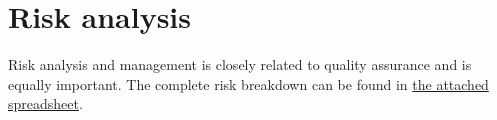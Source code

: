 \documentclass{report}
\begin{document}
		
		
	
	
	
	
	
	
	\chapter{Risk analysis}
	Risk analysis and management is closely related to quality assurance and is equally important. The complete risk breakdown can be found in \href{run: ./risk_analysis.xlsm}{the attached spreadsheet}. 
	
	
	
	\printbibliography
	
\end{document}
